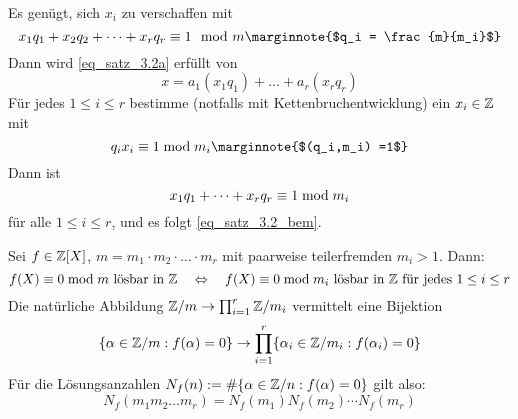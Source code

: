 	Es genügt, sich $x_i$ zu verschaffen mit
	\begin{equation}
		x_1q_1 + x_2q_2 + \dots + x_rq_r \kon 1 \mod m \marginnote{$q_i = \frac{m}{m_i}$} \label{eq_satz_3.2_bem}
	\end{equation}
	Dann wird \eqref{eq_satz_3.2a} erfüllt von
	\[x = a_1(x_1q_1) + \dots + a_r(x_rq_r) \]
	Für jedes $1 \leq i \leq r$ bestimme (notfalls mit Kettenbruchentwicklung) ein $x_i \in \mathbb{Z}$ mit
	\[ q_i x_i \kon 1 \modu m_i \marginnote{$(q_i,m_i) =1$} \]
	Dann ist 
	\[ x_1q_1 + \dots + x_rq_r \equiv 1 \bmod m_i\]
	für alle $1 \leq i \leq r$, und es folgt \eqref{eq_satz_3.2_bem}.
	
	Sei $f \in \mathbb{Z}[X]$, $m = m_1\cdot m_2 \cdot \dots \cdot m_r$ mit paarweise teilerfremden $m_i > 1$. Dann: 
	\[f(X) \equiv 0 \bmod m \text{ lösbar in } \mathbb{Z} \quad \Leftrightarrow \quad f(X) \equiv 0 \bmod m_i \text{ lösbar in } \mathbb{Z} \text{ für jedes } 1 \leq i \leq r \]
	Die natürliche Abbildung $\mathbb{Z}/m \rightarrow \prod_{i=1}^{r} \mathbb{Z}/m_i$ vermittelt eine Bijektion
	\[ \{\alpha \in \mathbb{Z}/m : f(\alpha) = 0\} \rightarrow \prod_{i=1}^{r} \{ \alpha_i \in \mathbb{Z}/m_i : f(\alpha_i) = 0 \} \]
	Für die Lösungsanzahlen $N_f(n) := \# \{\alpha \in \mathbb{Z}/n : f(\alpha) = 0 \}$ gilt also:
	\[N_f(m_1m_2\dots m_r) = N_f(m_1) N_f(m_2) \cdots N_f(m_r) \]
\cleardoubleemptypage